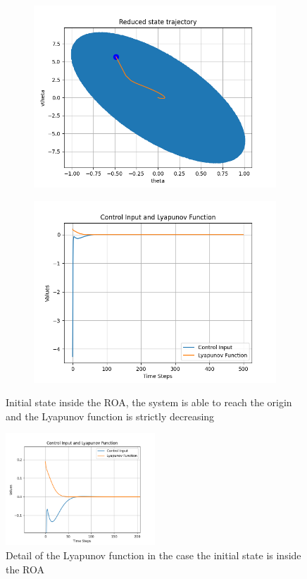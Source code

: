 \documentclass{article}
\begin{document}
\begin{figure}[H]
    \centering
    \begin{subfigure}{0.48\textwidth}
    \includegraphics[width=\textwidth]{img/red_state_inside}
    \end{subfigure}
    \hfill
    \begin{subfigure}{0.48\textwidth}
    \includegraphics[width=\textwidth]{img/lyap_inside}
    \end{subfigure}
    \caption{Initial state inside the ROA, the system is able to reach the origin and the Lyapunov function is strictly decreasing}
\end{figure}

\begin{figure}[H]
    \centering
    \includegraphics[width=0.5\textwidth]{img/detail_lyap}
    \caption{Detail of the Lyapunov function in the case the initial state is inside the ROA}
\end{figure}
\end{document}
